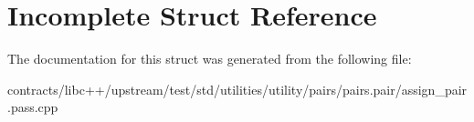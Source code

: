 \hypertarget{struct_incomplete}{}\section{Incomplete Struct Reference}
\label{struct_incomplete}


The documentation for this struct was generated from the following file\+:\begin{DoxyCompactItemize}
\item 
contracts/libc++/upstream/test/std/utilities/utility/pairs/pairs.\+pair/assign\+\_\+pair.\+pass.\+cpp\end{DoxyCompactItemize}
